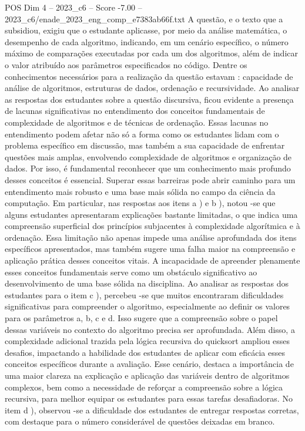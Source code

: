 \begin{textsample}{POS Dim 4 – 2023\_c6 – Score -7.00 – 2023\_c6/enade\_2023\_eng\_comp\_e7383ab66f.txt}
A questão, e o texto que a subsidiou, exigiu que o estudante aplicasse, por meio da análise matemática, o desempenho de cada algoritmo, indicando, em um cenário específico, o número máximo de comparações executadas por cada um dos algoritmos, além de indicar o valor atribuído aos parâmetros especificados no código.
Dentre os conhecimentos necessários para a realização da questão estavam : capacidade de análise de algoritmos, estruturas de dados, ordenação e recursividade.
Ao analisar as respostas dos estudantes sobre a questão discursiva, ficou evidente a presença de lacunas significativas no entendimento dos conceitos fundamentais de complexidade de algoritmos e de técnicas de ordenação.
Essas lacunas no entendimento podem afetar não só a forma como os estudantes lidam com o problema específico em discussão, mas também a sua capacidade de enfrentar questões mais amplas, envolvendo complexidade de algoritmos e organização de dados.
Por isso, é fundamental reconhecer que um conhecimento mais profundo desses conceitos é essencial.
Superar essas barreiras pode abrir caminho para um entendimento mais robusto e uma base mais sólida no campo da ciência da computação.
Em particular, nas respostas aos itens a ) e b ), notou -se que alguns estudantes apresentaram explicações bastante limitadas, o que indica uma compreensão superficial dos princípios subjacentes à complexidade algorítmica e à ordenação.
Essa limitação não apenas impede uma análise aprofundada dos itens específicos apresentados, mas também sugere uma falha maior na compreensão e aplicação prática desses conceitos vitais.
A incapacidade de apreender plenamente esses conceitos fundamentais serve como um obstáculo significativo ao desenvolvimento de uma base sólida na disciplina.
Ao analisar as respostas dos estudantes para o item c ), percebeu -se que muitos encontraram dificuldades significativas para compreender o algoritmo, especialmente ao definir os valores para os parâmetros a, b, c e d.
Isso sugere que a compreensão sobre o papel dessas variáveis no contexto do algoritmo precisa ser aprofundada.
Além disso, a complexidade adicional trazida pela lógica recursiva do quicksort ampliou esses desafios, impactando a habilidade dos estudantes de aplicar com eficácia esses conceitos específicos durante a avaliação.
Esse cenário, destaca a importância de uma maior clareza na explicação e aplicação das variáveis dentro de algoritmos complexos, bem como a necessidade de reforçar a compreensão sobre a lógica recursiva, para melhor equipar os estudantes para essas tarefas desafiadoras.
No item d ), observou -se a dificuldade dos estudantes de entregar respostas corretas, com destaque para o número considerável de questões deixadas em branco.

\end{textsample}
